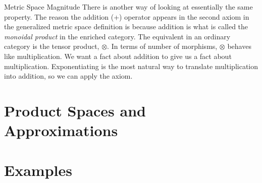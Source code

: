 \documentclass[12pt]{pom_thesis}
\begin{document}
\begin{chapter}{Metric Space Magnitude}
There is another way of looking at essentially the same property. The reason the addition (+) operator appears in the second axiom in the generalized metric space definition is because addition is what is called the \textit{monoidal product} in the enriched category. The equivalent in an ordinary category is the tensor product, $\otimes$. In terms of number of morphisms, $\otimes$ behaves like multiplication. We want a fact about addition to give us a fact about multiplication. Exponentiating is the most natural way to translate multiplication into addition, so we can apply the axiom.
\section{Product Spaces and Approximations}
\section{Examples}
\end{chapter}







\iffalse
\iffalse
We can replace the vectors $f,g$ with matrices to get the following generalization, which :
\begin{thm}[Two Variable M\"obius Inversion]\label{mob_inv_old}
Let $X$ be a lower finite poset.  Let $f,g:X \times X \rightarrow \Rr$ be given. Let $\zeta:X \times X \rightarrow \Rr$ be defined as usual, and let $\mu = \zeta^{-1}$. Then:
\begin{align*}
f = g \zeta &\iff g = f \mu;\\
f = \zeta g &\iff g = \mu f.
\end{align*}
Equivalently,
\begin{align*}
\forall x,y \in X, f(x,y) = \sum_{z \in X}g(x,z)\zeta(z,y) &\iff \forall x,y \in X, g(x,y) = \sum_{z \in X}f(x,z)\mu(z,y);\\
\forall x,y \in X, f(x,y) = \sum_{z \in X}\zeta(x,z)g(z,y) &\iff \forall x,y \in X, g(x,y) = \sum_{z \in X}\mu(x,z)f(z,y).
\end{align*}
\begin{proof}
Again, the result is trivial when we treat $f,g,\zeta,\mu$ as matrices.
\end{proof}
\end{thm}
\fi
\end{document}
